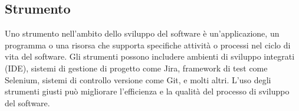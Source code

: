 \subsection*{Strumento} 
Uno strumento nell'ambito dello sviluppo del software è un'applicazione, un programma o una risorsa che supporta specifiche attività o processi nel ciclo di vita del software. Gli strumenti possono includere ambienti di sviluppo integrati (IDE), sistemi di gestione di progetto come Jira, framework di test come Selenium, sistemi di controllo versione come Git, e molti altri. L'uso degli strumenti giusti può migliorare l'efficienza e la qualità del processo di sviluppo del software. 
